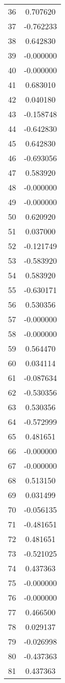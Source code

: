 \documentclass[12pt]{article}
\begin{document}
\begin{longtable}{@{}cc@{}}
36 & 0.707620 \\
37 & -0.762233 \\
38 & 0.642830 \\
39 & -0.000000 \\
40 & -0.000000 \\
41 & 0.683010 \\
42 & 0.040180 \\
43 & -0.158748 \\
44 & -0.642830 \\
45 & 0.642830 \\
46 & -0.693056 \\
47 & 0.583920 \\
48 & -0.000000 \\
49 & -0.000000 \\
50 & 0.620920 \\
51 & 0.037000 \\
52 & -0.121749 \\
53 & -0.583920 \\
54 & 0.583920 \\
55 & -0.630171 \\
56 & 0.530356 \\
57 & -0.000000 \\
58 & -0.000000 \\
59 & 0.564470 \\
60 & 0.034114 \\
61 & -0.087634 \\
62 & -0.530356 \\
63 & 0.530356 \\
64 & -0.572999 \\
65 & 0.481651 \\
66 & -0.000000 \\
67 & -0.000000 \\
68 & 0.513150 \\
69 & 0.031499 \\
70 & -0.056135 \\
71 & -0.481651 \\
72 & 0.481651 \\
73 & -0.521025 \\
74 & 0.437363 \\
75 & -0.000000 \\
76 & -0.000000 \\
77 & 0.466500 \\
78 & 0.029137 \\
79 & -0.026998 \\
80 & -0.437363 \\
81 & 0.437363 \\

\end{longtable}
\end{document}
